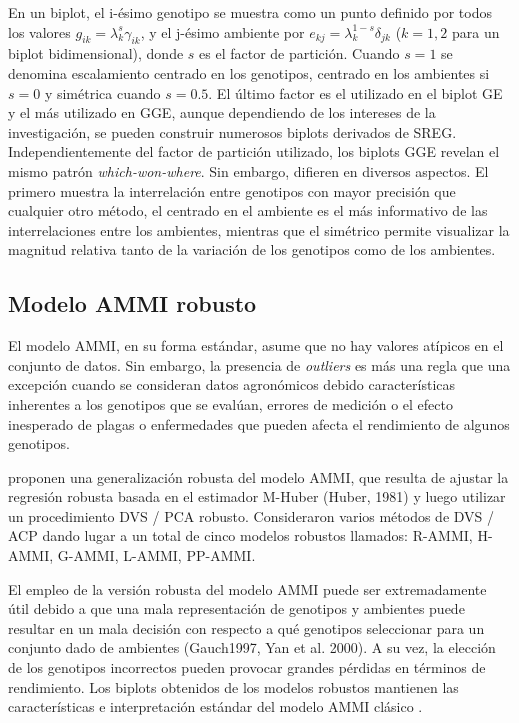 En un biplot, el i-ésimo genotipo se muestra como un punto definido por todos los valores $g_{ik} = \lambda_k^{s} \gamma_{ik}$, y el j-ésimo ambiente por $e_{kj} = \lambda_k^{1-s} \delta_{jk}$ ($k=1,2$ para un biplot bidimensional), donde $s$ es el factor de partición. Cuando $s=1$ se denomina escalamiento centrado en los genotipos, centrado en los ambientes si $s=0$ y simétrica cuando $s=0.5$. El último factor es el utilizado en el biplot GE y el más utilizado en GGE, aunque dependiendo de los intereses de la investigación, se pueden construir numerosos biplots derivados de SREG. Independientemente del factor de partición utilizado, los biplots GGE revelan el mismo patrón \emph{which-won-where}. Sin embargo, difieren en diversos aspectos. El primero muestra la interrelación entre genotipos con mayor precisión que cualquier otro método, el centrado en el ambiente es el más informativo de las interrelaciones entre los ambientes, mientras que el simétrico permite visualizar la magnitud relativa tanto de la variación de los genotipos como de los ambientes. 



\subsection{Modelo AMMI robusto}

El modelo AMMI, en su forma estándar, asume que no hay valores atípicos en el conjunto de datos. Sin embargo, la presencia de \emph{outliers} es más una regla que una excepción cuando se consideran datos agronómicos debido características inherentes a los genotipos que se evalúan, errores de medición o el efecto inesperado de plagas o enfermedades que pueden afecta el rendimiento de algunos genotipos.

\citet{Rodriguesetal2016} proponen una generalización robusta del modelo AMMI, que resulta de ajustar la regresión robusta basada en el estimador M-Huber (Huber, 1981) y luego utilizar un procedimiento DVS / PCA robusto. Consideraron varios métodos de DVS / ACP dando lugar a un total de cinco modelos robustos llamados: R-AMMI, H-AMMI, G-AMMI, L-AMMI, PP-AMMI. 

El empleo de la versión robusta del modelo AMMI puede ser extremadamente útil debido a que una mala representación de genotipos y ambientes puede resultar en un mala decisión con respecto a qué genotipos seleccionar para un conjunto dado de ambientes (Gauch1997, Yan et al. 2000). A su vez, la elección de los genotipos incorrectos pueden provocar grandes pérdidas en términos de rendimiento. Los biplots obtenidos de los modelos robustos mantienen las características e interpretación estándar del modelo AMMI clásico \citep{Rodriguesetal2016}.


